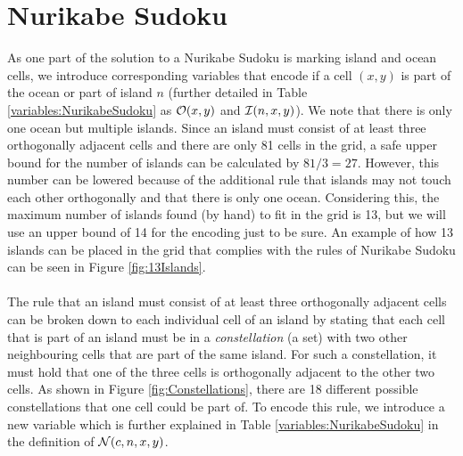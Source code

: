 \section{Nurikabe Sudoku}
As one part of the solution to a Nurikabe Sudoku is marking island and ocean cells, we introduce corresponding variables that encode if a cell $(x,y)$ is part of the ocean or part of island $n$ (further detailed in  Table \ref{variables:NurikabeSudoku} as $\mathcal{O}(x,y)$ and  $\mathcal{I}(n,x,y)$). We note that there is only one ocean but multiple islands. Since an island must consist of at least three orthogonally adjacent cells and there are only 81 cells in the grid, a safe upper bound for the number of islands can be calculated by $81/3=27$. However, this number can be lowered because of the additional rule that islands may not touch each other orthogonally and that there is only one ocean. Considering this, the maximum number of islands found (by hand) to fit in the grid is 13, but we will use an upper bound of 14 for the encoding just to be sure. An example of how 13 islands can be placed in the grid that complies with the rules of Nurikabe Sudoku can be seen in Figure \ref{fig:13Islands}.\\
\\
The rule that an island must consist of at least three orthogonally adjacent cells can be broken down to each individual cell of an island by stating that each cell that is part of an island must be in a \emph{constellation} (a set) with two other neighbouring cells that are part of the same island. For such a constellation, it must hold that one of the three cells is orthogonally adjacent to the other two cells. As shown in Figure \ref{fig:Constellations}, there are 18 different possible constellations that one cell could be part of. To encode this rule, we introduce a new variable which is further explained in Table \ref{variables:NurikabeSudoku} in the definition of $\mathcal{N}(c,n,x,y)$.\\


